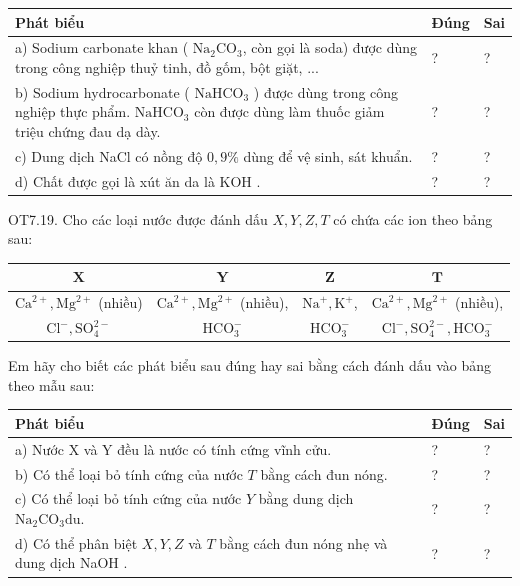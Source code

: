 \documentclass[10pt]{article}
\begin{document}
\begin{center}
\begin{tabular}{|l|l|l|}
\hline
Phát biểu & Đúng & Sai \\
\hline
a) Sodium carbonate khan ( $\mathrm{Na}_{2} \mathrm{CO}_{3}$, còn gọi là soda) được dùng trong công nghiệp thuỷ tinh, đồ gốm, bột giặt, ... & ? & ? \\
\hline
b) Sodium hydrocarbonate ( $\mathrm{NaHCO}_{3}$ ) được dùng trong công nghiệp thực phẩm. $\mathrm{NaHCO}_{3}$ còn được dùng làm thuốc giảm triệu chứng đau dạ dày. & ? & ? \\
\hline
c) Dung dịch NaCl có nồng độ $0,9 \%$ dùng để vệ sinh, sát khuẩn. & ? & ? \\
\hline
d) Chất được gọi là xút ăn da là KOH . & ? & ? \\
\hline
\end{tabular}
\end{center}

OT7.19. Cho các loại nước được đánh dấu $X, Y, Z, T$ có chứa các ion theo bảng sau:

\begin{center}
\begin{tabular}{|c|c|c|c|}
\hline
$\mathbf{X}$ & $\mathbf{Y}$ & $\mathbf{Z}$ & $\mathbf{T}$ \\
\hline
$\mathrm{Ca}^{2+}, \mathrm{Mg}^{2+}$ (nhiều) & $\mathrm{Ca}^{2+}, \mathrm{Mg}^{2+}$ (nhiều), & $\mathrm{Na}^{+}, \mathrm{K}^{+}$, & $\mathrm{Ca}^{2+}, \mathrm{Mg}^{2+}$ (nhiều), \\
$\mathrm{Cl}^{-}, \mathrm{SO}_{4}^{2-}$ & $\mathrm{HCO}_{3}^{-}$ & $\mathrm{HCO}_{3}^{-}$ & $\mathrm{Cl}^{-}, \mathrm{SO}_{4}^{2-}, \mathrm{HCO}_{3}^{-}$ \\
\hline
\end{tabular}
\end{center}

Em hãy cho biết các phát biểu sau đúng hay sai bằng cách đánh dấu vào bảng theo mẫu sau:

\begin{center}
\begin{tabular}{|l|l|l|}
\hline
Phát biểu & Đúng & Sai \\
\hline
a) Nước X và Y đều là nước có tính cứng vĩnh cửu. & ? & ? \\
\hline
b) Có thể loại bỏ tính cứng của nước $T$ bằng cách đun nóng. & ? & ? \\
\hline
c) Có thể loại bỏ tính cứng của nước $Y$ bằng dung dịch $\mathrm{Na}_{2} \mathrm{CO}_{3} \mathrm{du}$. & ? & ? \\
\hline
d) Có thể phân biệt $X, Y, Z$ và $T$ bằng cách đun nóng nhẹ và dung dịch NaOH . & ? & ? \\
\hline
\end{tabular}
\end{center}
\end{document}
